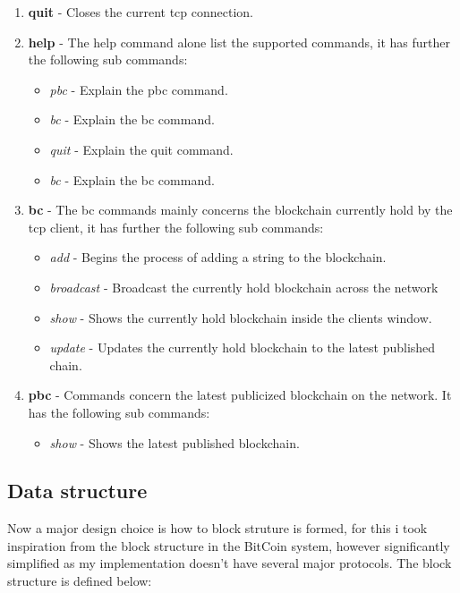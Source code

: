 \documentclass[paper=a4, fontsize=11pt]{scrartcl} %
\numberwithin{equation}{section} %
\numberwithin{figure}{section} %
\numberwithin{table}{section} %
\begin{document}
\begin{enumerate}
\item \textbf{quit} - Closes the current tcp connection.
\item \textbf{help} - The help command alone list the supported commands, it has further the following sub commands: 
\begin{itemize}
\item \textit{pbc} - Explain the pbc command.
\item \textit{bc} - Explain the bc command.
\item \textit{quit} - Explain the quit command.
\item \textit{bc} - Explain the bc command.
\end{itemize}
\item \textbf{bc} - The bc commands mainly concerns the blockchain currently hold by the tcp client, it has further the following sub commands: 
\begin{itemize}
\item \textit{add} - Begins the process of adding a string to the blockchain.
\item \textit{broadcast} - Broadcast the currently hold blockchain across the network
\item \textit{show} - Shows the currently hold blockchain inside the clients window.
\item \textit{update} - Updates the currently hold blockchain to the latest published chain.
\end{itemize}
\item \textbf{pbc} - Commands concern the latest publicized blockchain on the network. It has the following sub commands: 
\begin{itemize}
\item \textit{show} - Shows the latest published blockchain.
\end{itemize}
\end{enumerate}

\subsection{Data structure}

Now a major design choice is how to block struture is formed, for this i took inspiration from the block structure in the BitCoin system, however significantly simplified as my implementation doesn't have several major protocols. The block structure is defined below: 


\end{document}
